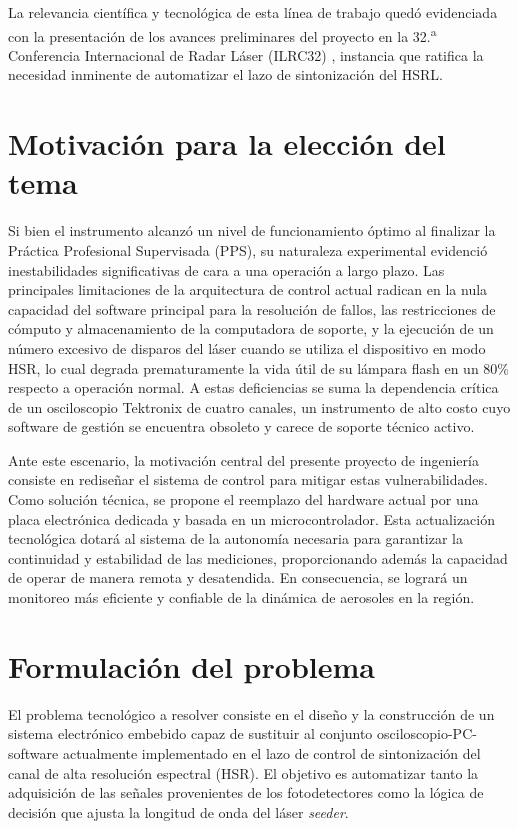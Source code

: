 La relevancia científica y tecnológica de esta línea de trabajo quedó evidenciada con la presentación de los avances preliminares del proyecto en la 32.\textsuperscript{a} Conferencia Internacional de Radar Láser (ILRC32) \cite{galvagno2026ilrc}, instancia que ratifica la necesidad inminente de automatizar el lazo de sintonización del HSRL.

\section{Motivación para la elección del tema}
\label{sec:motivacion}

Si bien el instrumento alcanzó un nivel de funcionamiento óptimo al finalizar la Práctica Profesional Supervisada (PPS), su naturaleza experimental evidenció inestabilidades significativas de cara a una operación a largo plazo. Las principales limitaciones de la arquitectura de control actual radican en la nula capacidad del software principal para la resolución de fallos, las restricciones de cómputo y almacenamiento de la computadora de soporte, y la ejecución de un número excesivo de disparos del láser cuando se utiliza el dispositivo en modo HSR, lo cual degrada prematuramente la vida útil de su lámpara flash en un 80\% respecto a operación normal. A estas deficiencias se suma la dependencia crítica de un osciloscopio Tektronix de cuatro canales, un instrumento de alto costo cuyo software de gestión se encuentra obsoleto y carece de soporte técnico activo.

Ante este escenario, la motivación central del presente proyecto de ingeniería consiste en rediseñar el sistema de control para mitigar estas vulnerabilidades. Como solución técnica, se propone el reemplazo del hardware actual por una placa electrónica dedicada y basada en un microcontrolador. Esta actualización tecnológica dotará al sistema de la autonomía necesaria para garantizar la continuidad y estabilidad de las mediciones, proporcionando además la capacidad de operar de manera remota y desatendida. En consecuencia, se logrará un monitoreo más eficiente y confiable de la dinámica de aerosoles en la región.

\section{Formulación del problema}
\label{sec:formulacion_problema}

El problema tecnológico a resolver consiste en el diseño y la construcción de un sistema electrónico embebido capaz de sustituir al conjunto osciloscopio-PC-software actualmente implementado en el lazo de control de sintonización del canal de alta resolución espectral (HSR). El objetivo es automatizar tanto la adquisición de las señales provenientes de los fotodetectores como la lógica de decisión que ajusta la longitud de onda del láser \emph{seeder}. 

